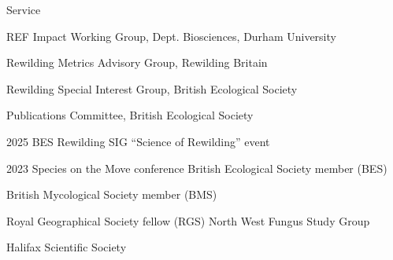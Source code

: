 \begin{rubric}{Service}
	\par REF Impact Working Group, Dept. Biosciences, Durham University
	\par Rewilding Metrics Advisory Group, Rewilding Britain
	\par Rewilding Special Interest Group, British Ecological Society
	\par Publications Committee, British Ecological Society	
	\par 2025 BES Rewilding SIG ``Science of Rewilding'' event
	\par 2023 Species on the Move conference 
	British Ecological Society member (BES)
	\par British Mycological Society member (BMS)
	\par Royal Geographical Society fellow (RGS)
	North West Fungus Study Group
	\par Halifax Scientific Society		
\end{rubric}


